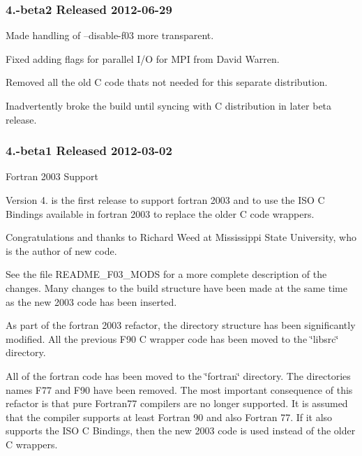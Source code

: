 \subsubsection*{4.-\/beta2 Released 2012-\/06-\/29}


\begin{DoxyItemize}
\item Made handling of --disable-\/f03 more transparent.
\item Fixed adding flags for parallel I/O for M\+PI from David Warren.
\item Removed all the old C code that\textquotesingle{}s not needed for this separate distribution.
\item Inadvertently broke the build until syncing with C distribution in later beta release.
\end{DoxyItemize}

\subsubsection*{4.-\/beta1 Released 2012-\/03-\/02}


\begin{DoxyItemize}
\item {\ttfamily Fortran 2003 Support}

Version 4. is the first release to support fortran 2003 and to use the I\+SO C Bindings available in fortran 2003 to replace the older C code wrappers.

Congratulations and thanks to Richard Weed at Mississippi State University, who is the author of new code.

See the file {\ttfamily R\+E\+A\+D\+M\+E\+\_\+\+F03\+\_\+\+M\+O\+DS} for a more complete description of the changes. Many changes to the build structure have been made at the same time as the new 2003 code has been inserted.

As part of the fortran 2003 refactor, the directory structure has been significantly modified. All the previous F90 C wrapper code has been moved to the \char`\"{}libsrc\char`\"{} directory.

All of the fortran code has been moved to the \char`\"{}fortran\char`\"{} directory. The directories names F77 and F90 have been removed. The most important consequence of this refactor is that pure Fortran77 compilers are no longer supported. It is assumed that the compiler supports at least Fortran 90 and also Fortran 77. If it also supports the I\+SO C Bindings, then the new 2003 code is used instead of the older C wrappers. 
\end{DoxyItemize}